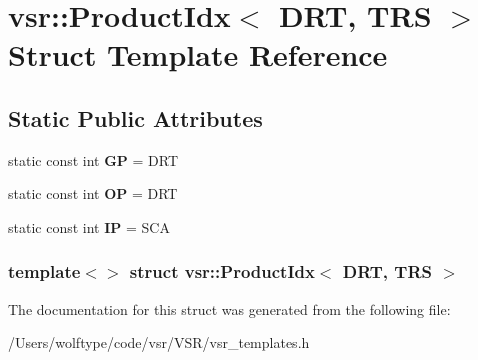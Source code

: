 \hypertarget{structvsr_1_1_product_idx_3_01_d_r_t_00_01_t_r_s_01_4}{\section{vsr\-:\-:Product\-Idx$<$ D\-R\-T, T\-R\-S $>$ Struct Template Reference}
\label{structvsr_1_1_product_idx_3_01_d_r_t_00_01_t_r_s_01_4}
}
\subsection*{Static Public Attributes}
\begin{DoxyCompactItemize}
\item 
\hypertarget{structvsr_1_1_product_idx_3_01_d_r_t_00_01_t_r_s_01_4_a31c21544a50ba9e355bd35752cdbe3da}{static const int {\bfseries G\-P} = D\-R\-T}\label{structvsr_1_1_product_idx_3_01_d_r_t_00_01_t_r_s_01_4_a31c21544a50ba9e355bd35752cdbe3da}

\item 
\hypertarget{structvsr_1_1_product_idx_3_01_d_r_t_00_01_t_r_s_01_4_a4a0a525c10bd85f16a0913e3d1808f71}{static const int {\bfseries O\-P} = D\-R\-T}\label{structvsr_1_1_product_idx_3_01_d_r_t_00_01_t_r_s_01_4_a4a0a525c10bd85f16a0913e3d1808f71}

\item 
\hypertarget{structvsr_1_1_product_idx_3_01_d_r_t_00_01_t_r_s_01_4_a0928e7dbbd2ca70bde8f0d66ad9feb66}{static const int {\bfseries I\-P} = S\-C\-A}\label{structvsr_1_1_product_idx_3_01_d_r_t_00_01_t_r_s_01_4_a0928e7dbbd2ca70bde8f0d66ad9feb66}

\end{DoxyCompactItemize}
\subsubsection*{template$<$$>$ struct vsr\-::\-Product\-Idx$<$ D\-R\-T, T\-R\-S $>$}



The documentation for this struct was generated from the following file\-:\begin{DoxyCompactItemize}
\item 
/\-Users/wolftype/code/vsr/\-V\-S\-R/vsr\-\_\-templates.\-h\end{DoxyCompactItemize}
